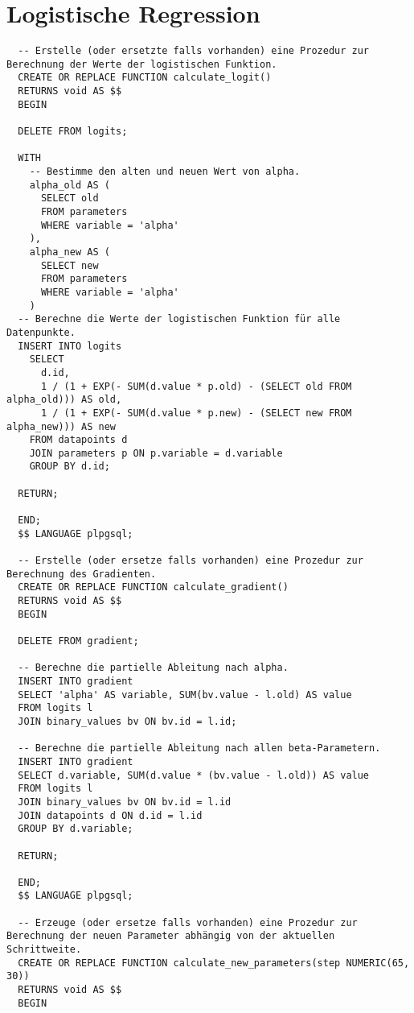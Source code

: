 \section{Logistische Regression}
\label{appendix:E:3}

\begin{verbatim}
  -- Erstelle (oder ersetzte falls vorhanden) eine Prozedur zur Berechnung der Werte der logistischen Funktion.
  CREATE OR REPLACE FUNCTION calculate_logit()
  RETURNS void AS $$
  BEGIN

  DELETE FROM logits;

  WITH
    -- Bestimme den alten und neuen Wert von alpha.
    alpha_old AS (
      SELECT old
      FROM parameters
      WHERE variable = 'alpha'
    ),
    alpha_new AS (
      SELECT new
      FROM parameters
      WHERE variable = 'alpha'
    )
  -- Berechne die Werte der logistischen Funktion für alle Datenpunkte.
  INSERT INTO logits
    SELECT
      d.id,
      1 / (1 + EXP(- SUM(d.value * p.old) - (SELECT old FROM alpha_old))) AS old,
      1 / (1 + EXP(- SUM(d.value * p.new) - (SELECT new FROM alpha_new))) AS new
    FROM datapoints d
    JOIN parameters p ON p.variable = d.variable
    GROUP BY d.id;

  RETURN;

  END;
  $$ LANGUAGE plpgsql;

  -- Erstelle (oder ersetze falls vorhanden) eine Prozedur zur Berechnung des Gradienten.
  CREATE OR REPLACE FUNCTION calculate_gradient()
  RETURNS void AS $$
  BEGIN

  DELETE FROM gradient;

  -- Berechne die partielle Ableitung nach alpha.
  INSERT INTO gradient
  SELECT 'alpha' AS variable, SUM(bv.value - l.old) AS value
  FROM logits l
  JOIN binary_values bv ON bv.id = l.id;

  -- Berechne die partielle Ableitung nach allen beta-Parametern.
  INSERT INTO gradient
  SELECT d.variable, SUM(d.value * (bv.value - l.old)) AS value
  FROM logits l
  JOIN binary_values bv ON bv.id = l.id
  JOIN datapoints d ON d.id = l.id
  GROUP BY d.variable;

  RETURN;

  END;
  $$ LANGUAGE plpgsql;

  -- Erzeuge (oder ersetze falls vorhanden) eine Prozedur zur Berechnung der neuen Parameter abhängig von der aktuellen Schrittweite.
  CREATE OR REPLACE FUNCTION calculate_new_parameters(step NUMERIC(65, 30))
  RETURNS void AS $$
  BEGIN


\end{verbatim}
